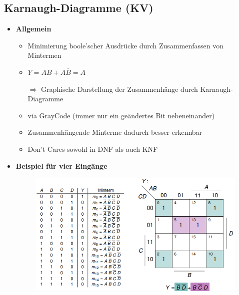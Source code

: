 \documentclass[11pt,a4paper]{article}
\begin{document}
\subsection{Karnaugh-Diagramme (KV)}
\begin{itemize}

\item \textbf{Allgemein}
	\begin{itemize}
	\item Minimierung boole'scher Ausdrücke durch Zusammenfassen von Mintermen
	\item $Y = AB +A\overline{B}= A$
	\item[$\Rightarrow$] Graphische Darstellung der Zusammenhänge durch Karnaugh-Diagramme
	\item via GrayCode (immer nur ein geändertes Bit nebeneinander)
	\item Zusammenhängende Minterme dadurch besser erkennbar
	\item Don't Cares sowohl in DNF als auch KNF
	\end{itemize}

\item \textbf{Beispiel für vier Eingänge}
	\item[] \begin{figure}[H]
				\begin{center}
				\includegraphics[height=6cm]{Bilder/karnaugh4}
				\end{center}
			\end{figure}
			

\end{itemize}
\end{document}
